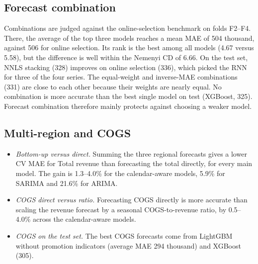 \documentclass[conference]{IEEEtran}
\begin{document}


\subsection{Forecast combination}
Combinations are judged against the online-selection benchmark on folds F2--F4.
There, the average of the top three models reaches a mean MAE of 504 thousand, against 506 for online selection.
Its rank is the best among all models (4.67 versus 5.58), but the difference is well within the Nemenyi CD of 6.66.
On the test set, NNLS stacking (328) improves on online selection (336), which picked the RNN for three of the four series.
The equal-weight and inverse-MAE combinations (331) are close to each other because their weights are nearly equal.
No combination is more accurate than the best single model on test (XGBoost, 325).
Forecast combination therefore mainly protects against choosing a weaker model.

\subsection{Multi-region and COGS}
\begin{itemize}
\item \emph{Bottom-up versus direct.} Summing the three regional forecasts gives a lower CV MAE for Total revenue than forecasting the total directly, for every main model. The gain is 1.3--4.0\% for the calendar-aware models, 5.9\% for SARIMA and 21.6\% for ARIMA.
\item \emph{COGS direct versus ratio.} Forecasting COGS directly is more accurate than scaling the revenue forecast by a seasonal COGS-to-revenue ratio, by 0.5--4.0\% across the calendar-aware models.
\item \emph{COGS on the test set.} The best COGS forecasts come from LightGBM without promotion indicators (average MAE 294 thousand) and XGBoost (305).
\end{itemize}
\end{document}
